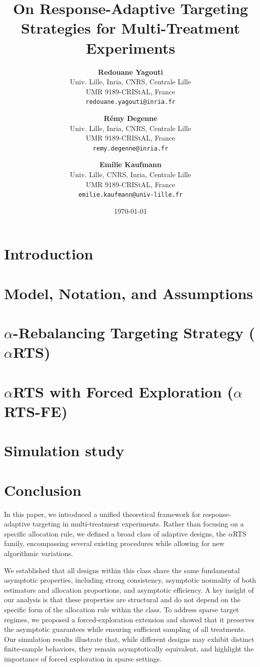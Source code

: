 \documentclass[11pt]{article}
\title{On Response-Adaptive Targeting Strategies for Multi-Treatment Experiments}
\author{
	\textbf{Redouane Yagouti}\\
	Univ. Lille, Inria,  CNRS, Centrale Lille\\ 
	UMR 9189-CRIStAL, France\\
	\texttt{redouane.yagouti@inria.fr}
	\and
	\textbf{Rémy Degenne}\\
	Univ. Lille, Inria,  CNRS, Centrale Lille\\ 
	UMR 9189-CRIStAL, France\\
	\texttt{remy.degenne@inria.fr}
	\and
	\textbf{Emilie Kaufmann}\\
	Univ. Lille, CNRS, Inria,  Centrale Lille\\
	UMR 9189-CRIStAL, France\\
	\texttt{emilie.kaufmann@univ-lille.fr}
}
\date{\today}
\theoremstyle{plain}
\theoremstyle{definition}
\begin{document}
	
	\maketitle
	
	\begin{abstract}		
		
	\end{abstract}
	
	\section{Introduction}
	
	
	
	\section{Model, Notation, and Assumptions}\label{sec:notations}
	
	
	\section{$\alpha$-Rebalancing Targeting Strategy (\(\alpha\)RTS)}\label{sec:alpha-rts}
	
	
	
	\section{$\alpha$RTS with Forced Exploration ($\alpha$RTS-FE)}\label{sec:alpha-rts-fe}
	
	
	\section{Simulation study}\label{sec:simulation}
	
	
	\section{Conclusion}\label{sec:conclusion}
	In this paper, we introduced a unified theoretical framework for response-adaptive targeting in multi-treatment experiments. Rather than focusing on a specific allocation rule, we defined a broad class of adaptive designs, the $\alpha$RTS family, encompassing several existing procedures while allowing for new algorithmic variations.
	
	We established that all designs within this class share the same fundamental asymptotic properties, including strong consistency, asymptotic normality of both estimators and allocation proportions, and asymptotic efficiency. A key insight of our analysis is that these properties are structural and do not depend on the specific form of the allocation rule within the class. To address sparse target regimes, we proposed a forced-exploration extension and showed that it preserves the asymptotic guarantees while ensuring sufficient sampling of all treatments. Our simulation results illustrate that, while different designs may exhibit distinct finite-sample behaviors, they remain asymptotically equivalent, and highlight the importance of forced exploration in sparse settings.
	
\end{document}
